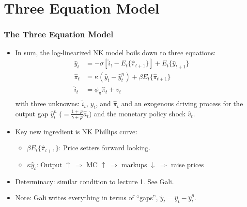 \documentclass[11pt,aspectratio=169,xcolor={dvipsnames},hyperref={pdftex,pdfpagemode=UseNone,hidelinks,pdfdisplaydoctitle=true},usepdftitle=false]{beamer}
\begin{document}
\section{Three Equation Model}

\begin{frame}
\frametitle{The Three Equation Model}
\begin{itemize}
	\item In sum, the log-linearized NK model boils down to three equations:
	\begin{align*}
		\hat{y}_t &=-\sigma[\hat{i}_t-E_t\{\hat{\pi}_{t+1}\}]+E_t\{\hat{y}_{t+1}\} \\
		\hat{\pi}_t&=\kappa (\hat{y}_t-\hat{y}_t^{n}) +\beta E_t \{\hat{\pi}_{t+1}\} \\
		\hat{i}_t&=\phi_\pi\hat{\pi}_t+v_t \\
	\end{align*}
	with three unknowns: $\hat{i}_t$, $\hat{y}_t$, and $\hat{\pi}_t$  and an exogenous driving
process for the output gap $\hat{y}_t^{n}$ ($=\frac{1+\varphi}{\gamma+\varphi}\hat{a}_t$) and the monetary policy shock $\hat{v}_t$.
	\item Key new ingredient is NK Phillips curve:
	\begin{itemize}
		\item $\beta E_t \{\hat{\pi}_{t+1}\}$: Price setters forward looking.
		\item $\kappa\hat{y}_t$: Output  $\uparrow\;\Rightarrow$ MC $\uparrow\;\Rightarrow$ markups $\downarrow\;\Rightarrow$ raise prices
	\end{itemize}
	\item Determinacy: similar condition to lecture 1. See Gali.
	\item Note: Gali writes everything in terms of ``gaps'', $\tilde{y}_t = \hat{y}_t-\hat{y}_t^{n}$.
\end{itemize}
\end{frame}
\end{document}

